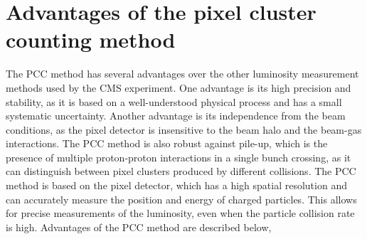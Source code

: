 \section{Advantages of the pixel cluster counting method}

The PCC method has several advantages over the other luminosity measurement methods used by the CMS experiment. One advantage is its high precision and stability, as it is based on a well-understood physical process and has a small systematic uncertainty. Another advantage is its independence from the beam conditions, as the pixel detector is insensitive to the beam halo and the beam-gas interactions. The PCC method is also robust against pile-up, which is the presence of multiple proton-proton interactions in a single bunch crossing, as it can distinguish between pixel clusters produced by different collisions. The PCC method is based on the pixel detector, which has a high spatial resolution and can accurately measure the position and energy of charged particles. This allows for precise measurements of the luminosity, even when the particle collision rate is high. Advantages of the PCC method are described below,

